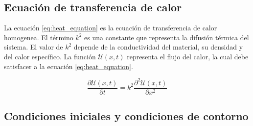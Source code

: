 \subsection{Ecuación de transferencia de calor}

La ecuación \ref{eq:heat_equation} es la ecuación de transferencia de calor homogenea. El término $k^2$ es una constante que representa la difusión térmica del sistema. El valor de $k^2$ depende de la conductividad del material, su densidad y del calor específico. La función $\mathcal{U}(x,t)$ representa el flujo del calor, la cual debe satisfacer a la ecuación \ref{eq:heat_equation}.

\begin{equation}
    \frac{\partial \mathcal{U}(x,t)}{\partial t} = k^2 \frac{\partial^2 \mathcal{U}(x,t)}{\partial x^2} \label{eq:heat_equation}
\end{equation}

\subsection{Condiciones iniciales y condiciones de contorno}